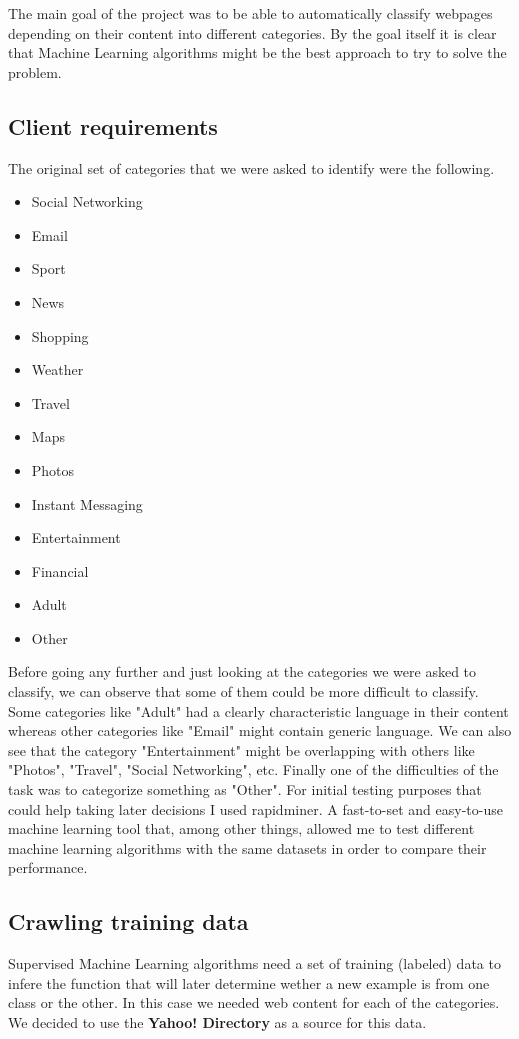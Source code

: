
The main goal of the project was to be able to automatically classify webpages depending on their content into different categories. 
By the goal itself it is clear that Machine Learning algorithms might be the best approach to try to solve the problem. 

\subsection{Client requirements}

The original set of categories that we were asked to identify were the following.

\begin{itemize}
  \item Social Networking
  \item Email
  \item Sport
  \item News
  \item Shopping
  \item Weather
  \item Travel
  \item Maps
  \item Photos
  \item Instant Messaging
  \item Entertainment
  \item Financial
  \item Adult
  \item Other
\end{itemize}

Before going any further and just looking at the categories we were asked to classify, we can observe that some of them could be more difficult to classify.
Some categories like "Adult" had a clearly characteristic language in their content whereas other categories like "Email" might contain generic language.
We can also see that the category "Entertainment" might be overlapping with others like "Photos", "Travel", "Social Networking", etc. 
Finally one of the difficulties of the task was to categorize something as "Other". 
For initial testing purposes that could help taking later decisions I used rapidminer. A fast-to-set and easy-to-use machine learning tool that, among other things, allowed me to test different
machine learning algorithms with the same datasets in order to compare their performance.

\subsection{Crawling training data}
Supervised Machine Learning algorithms need a set of training (labeled) data to infere the function that will later determine wether a new example is from one class or the other. In this case we needed
web content for each of the categories. We decided to use the {\bf Yahoo! Directory}\cite{yahoo} as a source for this data.
 

